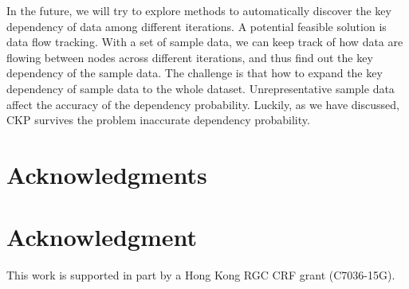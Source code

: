 \documentclass[10pt,journal,compsoc]{IEEEtran}
\begin{document}
In the future, we will try to explore methods to automatically discover the key dependency of data among different iterations. 
A potential feasible solution is data flow tracking. 
With a set of sample data, we can keep track of how data are flowing between nodes across different iterations, and thus find out the key dependency of the sample data. 
The challenge is that how to expand the key dependency of sample data to the whole dataset. 
Unrepresentative sample data affect the accuracy of the dependency probability. 
Luckily, as we have discussed, CKP survives the problem inaccurate dependency probability.


\ifCLASSOPTIONcompsoc
 \section*{Acknowledgments}
\else
 \section*{Acknowledgment}
\fi
This work is supported in part by a Hong Kong RGC CRF grant
(C7036-15G).


%
%

\end{document}
